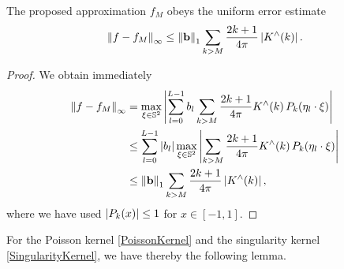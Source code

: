 \begin{lemma}\label{lemma:error}
  The proposed approximation $f_{M}$ obeys the uniform error estimate
  \begin{equation}
    \label{Applications:UniformErrorBound}
    \left\|f - f_{M}\right\|_{\infty} \le \left\|\mathbf{b}\right\|_1 \sum_{k>M}
    \frac{2k+1}{4\pi} \left\vert K^{\wedge}{\hspace{-0.4ex}}\left(k\right)\right\vert.
  \end{equation}
\end{lemma}
\begin{proof}
  We obtain immediately
  \begin{align*}
    \left\|f - f_{M}\right\|_{\infty} 
    & = \max_{\mathbf{\xi} \in \mathbb{S}^2} 
        \left|\sum_{l=0}^{L-1} b_{l} \sum_{k>M} \frac{2k+1}{4\pi} K^{\wedge}{\hspace{-0.4ex}}\left(k\right) 
        P_{k}{\hspace{-0.4ex}}\left(\mathbf{\eta}_{l} \cdot \mathbf{\xi}\right)\right| \\
    & \le \sum_{l=0}^{L-1} \left| b_{l} \right| \max_{\mathbf{\xi} \in \mathbb{S}^2} 
      \left| \sum_{k>M} \frac{2k+1}{4\pi} K^{\wedge}{\hspace{-0.4ex}}\left(k\right) 
      P_{k}{\hspace{-0.4ex}}\left(\mathbf{\eta}_{l} \cdot \mathbf{\xi}\right) \right| \\
    & \le \left\|\mathbf{b}\right\|_1 \sum_{k>M} \frac{2k+1}{4\pi} \left\vert K^{\wedge}{\hspace{-0.4ex}}\left(k\right)\right\vert,
  \end{align*}
  where we have used $\left|P_{k}{\hspace{-0.4ex}}\left(x\right)\right| \le 1$ for $x \in [-1,1]$. 
\end{proof}

For the Poisson kernel \eqref{PoissonKernel} and the singularity kernel
\eqref{SingularityKernel}, we have thereby the following lemma.

